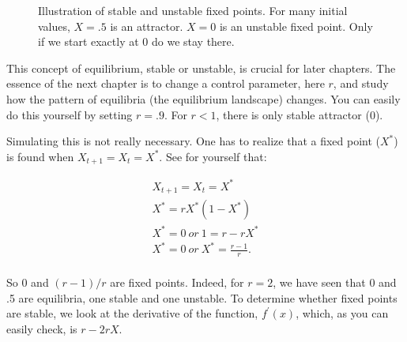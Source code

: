 \documentclass[
  a4paper,
  DIV=11,
  numbers=noendperiod,
  oneside]{scrreprt}
\begin{document}
\begin{figure}


\caption{\label{fig-ch2-img3}Illustration of stable and unstable fixed
points. For many initial values, \(X = .5\) is an attractor. \(X = 0\)
is an unstable fixed point. Only if we start exactly at 0 do we stay
there.}

\end{figure}%

This concept of equilibrium, stable or unstable, is crucial for later
chapters. The essence of the next chapter is to change a control
parameter, here \(r\), and study how the pattern of equilibria (the
equilibrium landscape) changes. You can easily do this yourself by
setting \(r = .9\). For \(r < 1\), there is only stable attractor (0).

Simulating this is not really necessary. One has to realize that a fixed
point (\(X^{*}\)) is found when \(X_{t + 1} = X_{t} = X^{*}\). See for
yourself that:

\[
\begin{gathered}
X_{t + 1} = X_{t} = X^{*} \\
X^{*} = rX^{*}( 1 - X^{*}) \\
X^{*} = 0\ or\ 1 = r - rX^{*} \\
X^{*} = 0\ or\ X^{*} = \frac{r - 1}{r}. \\
\end{gathered}
\]

So 0 and \((r - 1)/r\) are fixed points. Indeed, for \(r = 2\), we have
seen that 0 and .5 are equilibria, one stable and one unstable. To
determine whether fixed points are stable, we look at the derivative of
the function, \(f^{'}(x)\), which, as you can easily check, is
\(r - 2rX\).
\end{document}
